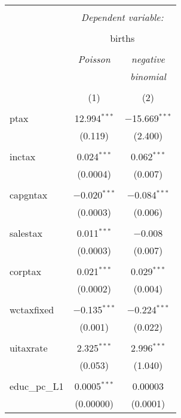 
\begin{table}[!htbp] \centering 
  \caption{} 
  \label{} 
\begin{tabular}{@{\extracolsep{5pt}}lcc} 
\\[-1.8ex]\hline 
\hline \\[-1.8ex] 
 & \multicolumn{2}{c}{\textit{Dependent variable:}} \\ 
\cline{2-3} 
\\[-1.8ex] & \multicolumn{2}{c}{births} \\ 
\\[-1.8ex] & \textit{Poisson} & \textit{negative} \\ 
 & \textit{} & \textit{binomial} \\ 
\\[-1.8ex] & (1) & (2)\\ 
\hline \\[-1.8ex] 
 ptax & 12.994$^{***}$ & $-$15.669$^{***}$ \\ 
  & (0.119) & (2.400) \\ 
  & & \\ 
 inctax & 0.024$^{***}$ & 0.062$^{***}$ \\ 
  & (0.0004) & (0.007) \\ 
  & & \\ 
 capgntax & $-$0.020$^{***}$ & $-$0.084$^{***}$ \\ 
  & (0.0003) & (0.006) \\ 
  & & \\ 
 salestax & 0.011$^{***}$ & $-$0.008 \\ 
  & (0.0003) & (0.007) \\ 
  & & \\ 
 corptax & 0.021$^{***}$ & 0.029$^{***}$ \\ 
  & (0.0002) & (0.004) \\ 
  & & \\ 
 wctaxfixed & $-$0.135$^{***}$ & $-$0.224$^{***}$ \\ 
  & (0.001) & (0.022) \\ 
  & & \\ 
 uitaxrate & 2.325$^{***}$ & 2.996$^{***}$ \\ 
  & (0.053) & (1.040) \\ 
  & & \\ 
 educ\_pc\_L1 & 0.0005$^{***}$ & 0.00003 \\ 
  & (0.00000) & (0.0001) \\ 

\end{tabular}
\end{table}
